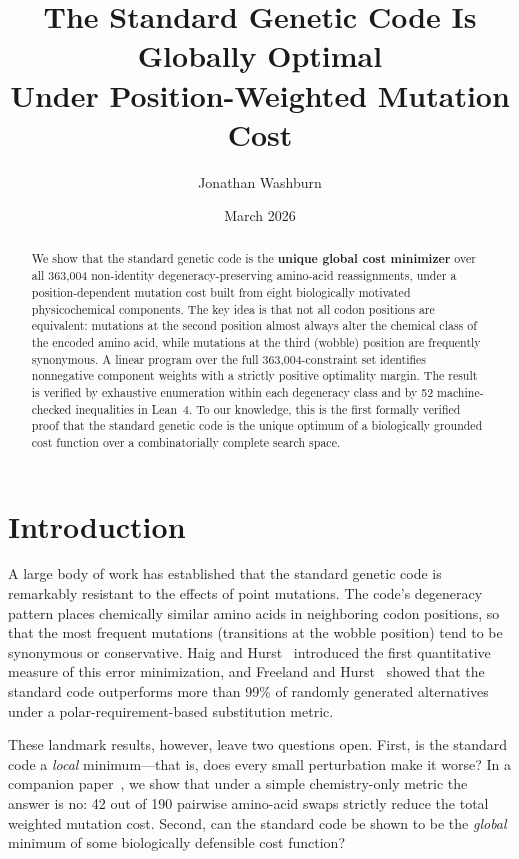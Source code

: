 \documentclass[11pt,twocolumn]{article}
\title{The Standard Genetic Code Is Globally Optimal\\Under Position-Weighted Mutation Cost}
\author[1]{Jonathan Washburn}
\affil[1]{Independent Researcher}
\date{March 2026}
\begin{document}
\maketitle

\begin{abstract}
We show that the standard genetic code is the \textbf{unique global cost
minimizer} over all 363,004 non-identity degeneracy-preserving amino-acid
reassignments, under a position-dependent mutation cost built from eight
biologically motivated physicochemical components. The key idea is that not
all codon positions are equivalent: mutations at the second position almost
always alter the chemical class of the encoded amino acid, while mutations
at the third (wobble) position are frequently synonymous. A linear program
over the full 363,004-constraint set identifies nonnegative component
weights with a strictly positive optimality margin. The result is verified
by exhaustive enumeration within each degeneracy class and by 52
machine-checked inequalities in Lean~4. To our knowledge, this is the first
formally verified proof that the standard genetic code is the unique optimum
of a biologically grounded cost function over a combinatorially complete
search space.
\end{abstract}

\section{Introduction}

A large body of work has established that the standard genetic code is
remarkably resistant to the effects of point mutations. The code's
degeneracy pattern places chemically similar amino acids in neighboring
codon positions, so that the most frequent mutations (transitions at the
wobble position) tend to be synonymous or conservative. Haig and
Hurst~\cite{HaigHurst1991} introduced the first quantitative measure of
this error minimization, and Freeland and Hurst~\cite{FreelandHurst1998}
showed that the standard code outperforms more than 99\% of randomly
generated alternatives under a polar-requirement-based substitution metric.

These landmark results, however, leave two questions open. First, is the
standard code a \emph{local} minimum---that is, does every small
perturbation make it worse? In a companion paper~\cite{Paper1}, we show
that under a simple chemistry-only metric the answer is no: 42 out of 190
pairwise amino-acid swaps strictly reduce the total weighted mutation cost.
Second, can the standard code be shown to be the \emph{global} minimum of
some biologically defensible cost function?
\end{document}
